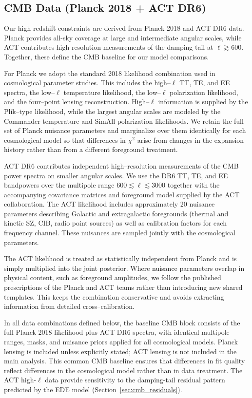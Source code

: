\documentclass[a4paper,11pt]{article}
\begin{document}
\subsection{CMB Data (Planck 2018 + ACT DR6)}
\label{sec:cmb_data}

Our high-redshift constraints are derived from Planck 2018 and ACT DR6 data. Planck provides all-sky coverage at large and intermediate angular scales, while ACT contributes high-resolution measurements of the damping tail at $\ell \gtrsim 600$. Together, these define the CMB baseline for our model comparisons.

For Planck we adopt the standard 2018 likelihood combination used in cosmological parameter studies. This includes the high--$\ell$ TT, TE, and EE spectra, the low--$\ell$ temperature likelihood, the low--$\ell$ polarization likelihood, and the four--point lensing reconstruction. High--$\ell$ information is supplied by the Plik--type likelihood, while the largest angular scales are modeled by the Commander temperature and SimAll polarization likelihoods. We retain the full set of Planck nuisance parameters and marginalize over them identically for each cosmological model so that differences in $\chi^2$ arise from changes in the expansion history rather than from a different foreground treatment.

ACT DR6 contributes independent high--resolution measurements of the CMB power spectra on smaller angular scales. We use the DR6 TT, TE, and EE bandpowers over the multipole range $600 \lesssim \ell \lesssim 3000$ together with the accompanying covariance matrices and foreground model supplied by the ACT collaboration. The ACT likelihood includes approximately 20 nuisance parameters describing Galactic and extragalactic foregrounds (thermal and kinetic SZ, CIB, radio point sources) as well as calibration factors for each frequency channel. These nuisances are sampled jointly with the cosmological parameters.

The ACT likelihood is treated as statistically independent from Planck and is simply multiplied into the joint posterior. Where nuisance parameters overlap in physical content, such as foreground amplitudes, we follow the published prescriptions of the Planck and ACT teams rather than introducing new shared templates. This keeps the combination conservative and avoids extracting information from detailed cross--calibration.

In all data combinations defined below, the baseline CMB block consists of the full Planck 2018 likelihood plus ACT DR6 spectra, with identical multipole ranges, masks, and nuisance priors applied for all cosmological models. Planck lensing is included unless explicitly stated; ACT lensing is not included in the main analysis. This common CMB baseline ensures that differences in fit quality reflect differences in the cosmological model rather than in data treatment. The ACT high-$\ell$ data provide sensitivity to the damping-tail residual pattern predicted by the EDE model (Section~\ref{sec:cmb_residuals}).
\end{document}
